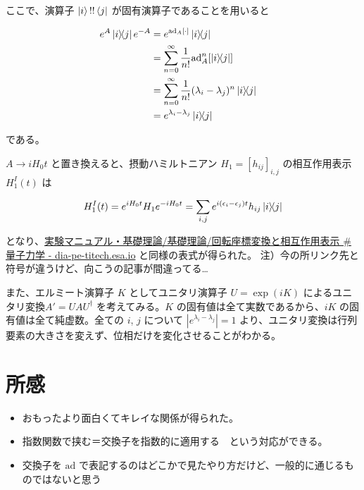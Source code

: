 \documentclass[a4paper, platex]{jsarticle}
\def\tightlist{\itemsep1pt\parskip0pt\parsep0pt}
\begin{document}
ここで、演算子 \(\ket{i}\\!\\!\bra{j}\) が固有演算子であることを用いると

\begin{align}
e^A \ket{i}\!\!\bra{j} e^{-A} &= e^{\mathrm{ad}_A[\cdot]} \ket{i}\!\!\bra{j} \cr
  &= \sum_{n=0}^\infty \frac{1}{n!}\mathrm{ad}_A^n[\ket{i}\!\!\bra{j}] \cr
  &= \sum_{n=0}^\infty \frac{1}{n!} (\lambda_i - \lambda_j)^n \ket{i}\!\!\bra{j}\cr
  &= e^{\lambda_i - \lambda_j} \ket{i}\!\!\bra{j}
\end{align}

である。

\(A \to i H_0 t\) と置き換えると、摂動ハミルトニアン
\(H_1 = [h_{ij}]_{i,j}\) の相互作用表示 \(H_1^I(t)\) は

\begin{equation}
H_1^I(t) = e^{iH_0t} H_1 e^{-iH_0t} = \sum_{i,j} e^{i(\epsilon_i - \epsilon_j)t} h_{ij} \ket{i}\!\!\bra{j}
\end{equation}

となり、\href{https://dia-pe-titech.esa.io/posts/406}{実験マニュアル・基礎理論/基礎理論/回転座標変換と相互作用表示
\#量子力学 - dia-pe-titech.esa.io} と同様の表式が得られた。
注）今の所リンク先と符号が違うけど、向こうの記事が間違ってる\ldots{}

また、エルミート演算子 \(K\) としてユニタリ演算子 \(U=\exp(iK)\)
によるユニタリ変換\(A' = UAU^\dagger\) を考えてみる。\(K\)
の固有値は全て実数であるから、\(iK\) の固有値は全て純虚数。全ての \(i\),
\(j\) について \(|e^{\lambda_i - \lambda_j}|=1\)
より、ユニタリ変換は行列要素の大きさを変えず、位相だけを変化させることがわかる。

\hypertarget{ux6240ux611f}{%
\section{所感}\label{ux6240ux611f}}

\begin{itemize}
\tightlist
\item
  おもったより面白くてキレイな関係が得られた。
\item
  指数関数で挟む＝交換子を指数的に適用する　という対応ができる。
\item
  交換子を \(\mathrm{ad}\)
  で表記するのはどこかで見たやり方だけど、一般的に通じるものではないと思う
\end{itemize}
\end{document}
